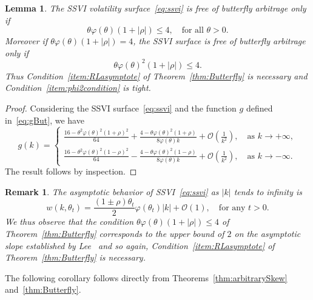 \documentclass[12pt]{article}
\newtheorem{lemma}{Lemma}[section]
\newtheorem{remark}{Remark}[section]
\numberwithin{equation}{section}
\begin{document}
\begin{lemma}
The SSVI volatility surface~\eqref{eq:ssvi} is free of butterfly arbitrage only if
$$
\theta\varphi(\theta)\left(1+|\rho|\right) \leq 4,
\quad\text{for all }\theta>0.
$$
Moreover if $\theta\varphi(\theta)\left(1+|\rho|\right)=4$, the SSVI surface is free of butterfly arbitrage only if
$$
\theta\varphi(\theta)^2\left(1+|\rho|\right)\leq 4.
$$
Thus Condition~\ref{item:RLasymptote} of Theorem~\ref{thm:Butterfly} is necessary and Condition~\ref{item:phi2condition} is tight.
\end{lemma}
\begin{proof}
Considering the SSVI surface~\eqref{eq:ssvi} and the function $g$ defined in~\eqref{eq:gBut},
we have
$$
g(k) =
\left\{
\begin{array}{ll}
\displaystyle \frac{16-\theta^2\varphi(\theta)^2\left(1+\rho\right)^2}{64}+\frac{4-\theta\varphi(\theta)^2 \left(1+\rho\right)}{8\varphi(\theta) k}+\mathcal{O}\left(\frac{1}{k^2}\right),
\quad\text{as }k\to+\infty,\\
\displaystyle \frac{16-\theta^2\varphi(\theta)^2\left(1-\rho\right)^2}{64}-\frac{4-\theta\varphi(\theta)^2\left(1-\rho\right)}
{8\varphi(\theta)k}+\mathcal{O}\left(\frac{1}{k^2}\right),\quad\text{as }k\to-\infty.
\end{array}
\right.
$$
The result follows by inspection.
\end{proof}

\begin{remark}\label{rem:AsymptoticSlopes}
The asymptotic behavior of SSVI~\eqref{eq:ssvi} as $|k|$ tends to infinity is
$$
w(k,\theta_t) =\frac{\left(1\pm \rho\right)\theta_t}{2}\varphi(\theta_t)\left|k\right|+\mathcal{O}(1),
\quad\text{for any }t>0.
$$
We thus observe that the condition $\theta\varphi(\theta)\left(1+|\rho|\right)\leq 4$ of Theorem~\ref{thm:Butterfly}
 corresponds to the upper bound of $2$ on the asymptotic slope established by Lee~\cite{RogerLee} and so again, Condition~\ref{item:RLasymptote} of Theorem~\ref{thm:Butterfly} is necessary.
\end{remark}

The following corollary follows directly from Theorems~\ref{thm:arbitrarySkew} and~\ref{thm:Butterfly}.
\end{document}
